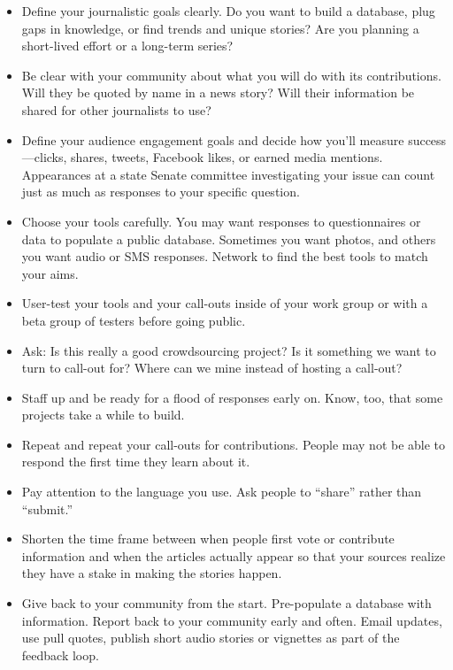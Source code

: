 \begin{itemize}
\begin{itemize}
\begin{itemize}
\item Define your journalistic goals clearly. Do you want to build a database, plug gaps in knowledge, or find trends and unique stories? Are you planning a short-lived effort or a long-term series?

\item Be clear with your community about what you will do with its contributions. Will they be quoted by name in a news story? Will their information be shared for other journalists to use?

\item Define your audience engagement goals and decide how you’ll measure success---clicks, shares, tweets, Facebook likes, or earned media mentions. Appearances at a state Senate committee investigating your issue can count just as much as responses to your specific question. 

\item Choose your tools carefully. You may want responses to questionnaires or data to populate a public database. Sometimes you want photos, and others you want audio or SMS responses. Network to find the best tools to match your aims.

\item User-test your tools and your call-outs inside of your work group or with a beta group of testers before going public.

\item Ask: Is this really a good crowdsourcing project? Is it something we want to turn to call-out for? Where can we mine instead of hosting a call-out?

\item Staff up and be ready for a flood of responses early on. Know, too, that some projects take a while to build. 

\item Repeat and repeat your call-outs for contributions. People may not be able to respond the first time they learn about it.

\item Pay attention to the language you use. Ask people to ``share'' rather than ``submit.''

\item Shorten the time frame between when people first vote or contribute information and when the articles actually appear so that your sources realize they have a stake in making the stories happen.  

\item Give back to your community from the start. Pre-populate a database with information. Report back to your community early and often. Email updates, use pull quotes, publish short audio stories or vignettes as part of the feedback loop. 


\end{itemize}
\end{itemize}
\end{itemize}
